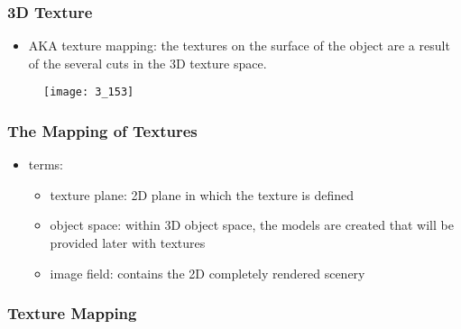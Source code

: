 \documentclass{standalone}
\begin{document}
\subsubsection*{3D Texture}

\begin{itemize}
	\item AKA texture mapping: the textures on the surface of the object are a result of the several cuts in the 3D texture space.
\end{itemize}

\begin{figure}
	\texttt{[image: 3\_153]}
\end{figure}


\subsubsection{The Mapping of Textures}

\begin{itemize}
	\item terms:
		\begin{itemize}
			\item texture plane: 2D plane in which the texture is defined
			\item object space: within 3D object space, the models are created that will be provided later with textures
			\item image field: contains the 2D completely rendered scenery
		\end{itemize}
\end{itemize}

\subsubsection*{Texture Mapping}
       
\end{document}
